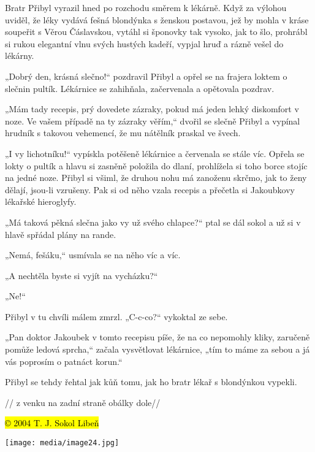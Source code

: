 Bratr Přibyl vyrazil hned po rozchodu směrem k lékárně. Když za výlohou
uviděl, že léky vydává fešná blondýnka s ženskou postavou, jež by mohla
v kráse soupeřit s Věrou Čáslavskou, vytáhl si šponovky tak vysoko, jak
to šlo, prohrábl si rukou elegantní vlnu svých hustých kadeří, vypjal
hruď a rázně vešel do lékárny.

„Dobrý den, krásná slečno!{}`` pozdravil Přibyl a opřel se na frajera
loktem o slečnin pultík. Lékárnice se zahihňala, začervenala a opětovala
pozdrav.

„Mám tady recepis, prý dovedete zázraky, pokud má jeden lehký diskomfort
v noze. Ve vašem případě na ty zázraky věřím,`` dvořil se slečně Přibyl
a vypínal hrudník s takovou vehemencí, že mu nátělník praskal ve švech.

„I vy lichotníku!{}`` vypískla potěšeně lékárnice a červenala se stále
víc. Opřela se lokty o pultík a hlavu si zasněně položila do dlaní,
prohlížela si toho borce stojíc na jedné noze. Přibyl si všiml, že
druhou nohu má zanoženu skrčmo, jak to ženy dělají, jsou-li vzrušeny.
Pak si od něho vzala recepis a přečetla si Jakoubkovy lékařské
hieroglyfy.

„Má taková pěkná slečna jako vy už svého chlapce?{}`` ptal se dál sokol
a už si v hlavě spřádal plány na rande.

„Nemá, fešáku,`` usmívala se na něho víc a víc.

„A nechtěla byste si vyjít na vycházku?{}``

„Ne!{}``

Přibyl v tu chvíli málem zmrzl. „C-c-co?{}`` vykoktal ze sebe.

„Pan doktor Jakoubek v tomto recepisu píše, že na co nepomohly kliky,
zaručeně pomůže ledová sprcha,`` začala vysvětlovat lékárnice, „tím to
máme za sebou a já vás poprosím o patnáct korun.``

Přibyl se tehdy řehtal jak kůň tomu, jak ho bratr lékař s blondýnkou
vypekli.

// z venku na zadní straně obálky dole//

\hl{© 2004 T. J. Sokol Libeň}

\texttt{[image: media/image24.jpg]}
